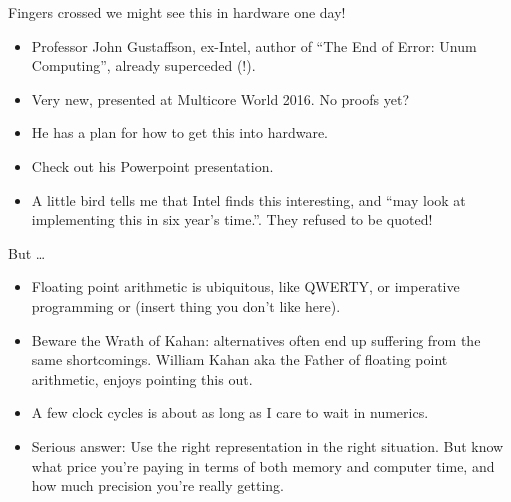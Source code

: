 \documentclass{beamer}
\begin{document}
\begin{frame}{Fingers crossed we might see this in hardware one day!}
\begin{itemize}
\item Professor John Gustaffson, ex-Intel, author of ``The End of Error: Unum Computing'',
			already superceded (!).
\item Very new, presented at Multicore World 2016. No proofs yet?
\item He has a plan for how to get this into hardware.
\item Check out his Powerpoint presentation.
\item A little bird tells me that Intel finds this interesting, and ``may look at implementing this in
			six year's time.''. They refused to be quoted!
\end{itemize}
\end{frame}

\begin{frame}{But \ldots}
\begin{itemize}
\item Floating point arithmetic is ubiquitous, like QWERTY, or imperative programming or (insert thing
			you don't like here).
\item Beware the Wrath of Kahan: alternatives often end up suffering from the same shortcomings. 
			William Kahan aka the Father of floating point arithmetic, enjoys pointing this out.
\item A few clock cycles is about as long as I care to wait in numerics.
\item Serious answer: Use the right representation in the right situation. But know what price you're paying 				in terms of both memory and computer time, and how much precision you're really getting.
\end{itemize}
\end{frame}

\end{document}
